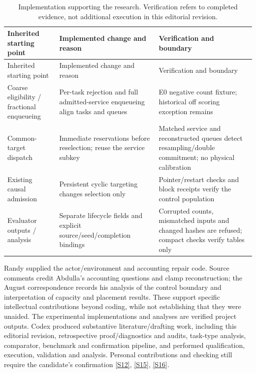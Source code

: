 \documentclass[11pt,a4paper]{article}
\begin{document}
\begingroup
\small
\begin{xltabular}{\textwidth}{@{}YYY@{}}
\caption{Implementation supporting the research. Verification refers to completed evidence, not additional execution in this editorial revision.}\label{tab:11} \\
\toprule
Inherited starting point & Implemented change and reason & Verification and boundary \\
\midrule\endfirsthead
\toprule
Inherited starting point & Implemented change and reason & Verification and boundary \\
\midrule\endhead
\bottomrule\endfoot
Coarse eligibility / fractional enqueueing & Per-task rejection and full admitted-service enqueueing align tasks and queues & E0 negative count fixture; historical off scoring exception remains \\
Common-target dispatch & Immediate reservations before reselection; reuse the service subkey & Matched service and reconstructed queues detect resampling/double commitment; no physical calibration \\
Existing causal admission & Persistent cyclic targeting changes selection only & Pointer/restart checks and block receipts verify the control population \\
Evaluator outputs / analysis & Separate lifecycle fields and explicit source/seed/completion bindings & Corrupted counts, mismatched inputs and changed hashes are refused; compact checks verify tables only \\
\end{xltabular}
\endgroup

Randy supplied the actor/environment and accounting repair code. Source comments credit Abdulla's accounting questions and clamp reconstruction; the August correspondence records his analysis of the control boundary and interpretation of capacity and placement results. These support specific intellectual contributions beyond coding, while not establishing that they were unaided. The experimental implementations and analyses are verified project outputs. Codex produced substantive literature/drafting work, including this editorial revision, retrospective proof/diagnostics and audits, task-type analysis, comparator, benchmark and confirmation pipeline, and performed qualification, execution, validation and analysis. Personal contributions and checking still require the candidate's confirmation \hyperref[source-s12]{[S12]}, \hyperref[source-s15]{[S15]}, \hyperref[source-s16]{[S16]}.
\end{document}
